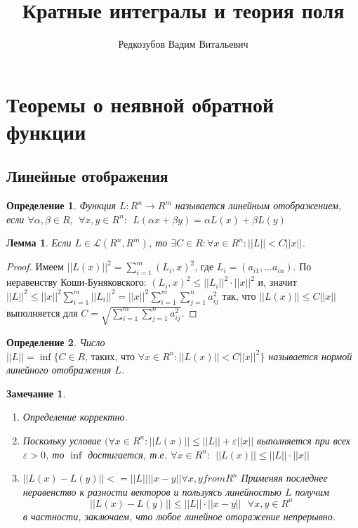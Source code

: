 \documentclass{article}
\author{Редкозубов Вадим Витальевич}
\title{Кратные интегралы и теория поля}
\newtheorem*{df}{Определение}
\newtheorem{lem}{Лемма}
\newtheorem*{ntc}{Замечание}
\begin{document}
  \section*{Теоремы о неявной обратной функции}
  
  \subsection*{Линейные отображения}
  
  \begin{df}
  Функция $ L: R^n \rightarrow R^m $ называется линейным отображением, если $ \forall \alpha, \beta \in R,~~ \forall x, y \in R^n: ~~ L(\alpha x + \beta y) = \alpha L(x) + \beta L(y) $
  \end{df}
    
  \begin{lem}
  Если $ L \in \mathcal{L}(R^n, R^m) $, то $ \exists C  \in R : \forall x \in R^n :|| L|| < C||x|| $.
  \end{lem}
  
  \begin{proof}
  Имеем $|| L(x)||^2 = \sum \limits_{i=1}^m (L_i, x)^2 $, где $ L_i = (a_{i1}, \ldots a_{in}) $. По неравенству Коши-Буняковского: $(L_i, x)^2 \leqslant ||L_i||^2 \cdot|| x||^2 $ и, значит $|| L||^2 \leqslant ||x||^2 \sum\limits_{i=1}^m|| L_i||^2 =|| x||^2 \sum\limits_{i = 1}^m \sum \limits_{j=1}^n a_{ij}^2 $ так, что $|| L(x)|| \leqslant C|| x|| $ выполняется для $ C = \sqrt{\sum\limits_{i = 1}^m \sum \limits_{j=1}^n a_{ij}^2} $.
  \end{proof}
  
  \begin{df}
   Число $|| L|| = \inf \{C \in R \text{, таких, что } \forall x \in R^n:|| L(x)|| < C|| x||^2  \} $  называется нормой линейного отображения $ L $.
  \end{df}
    
  \begin{ntc}~
  \begin{enumerate}
  \item Определение корректно.
  \item Поскольку условие  $ ( \forall x \in R^n :|| L(x)|| \leqslant|| L|| + \varepsilon||x||$ выполняется при всех $\varepsilon > 0$, то $\inf$ достигается, т.е. $\forall  x \in R^n : ~~|| L(x)|| \leqslant|| L|| \cdot|| x|| $
  \item $||L(x) - L(y)|| <=||L||||x-y|| \forall x,y from R^n $ Применяя последнее неравенство к разности векторов и пользуясь линейностью $L$ получим
  $$ || L(x) - L(y)|| \leq||L||\cdot||x - y||~~~ \forall x, y \in R^n $$ 
  в частности, заключаем, что любое линейное оторажение непрерывно.
  \end{enumerate}
  \end{ntc}
  
\end{document}
